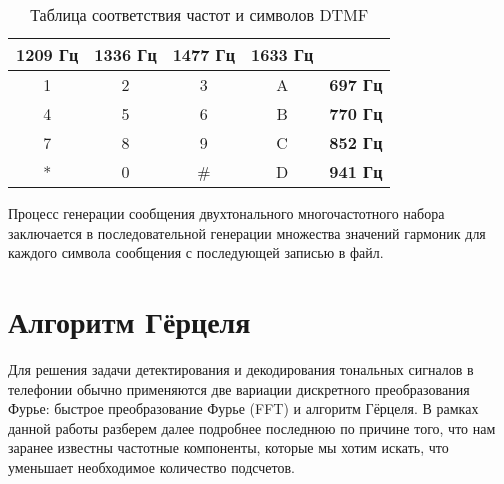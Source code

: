 \begin{table}[ht]
\centering\small
	\caption{Таблица соответствия частот и символов DTMF}
	\label{tab:lrt}	
\begin{tabular}{|c|c|c|c|l|}
\hline
\multicolumn{1}{|l|}{\textbf{1209 Гц}} & \multicolumn{1}{l|}{\textbf{1336 Гц}} & \multicolumn{1}{l|}{\textbf{1477 Гц}} & \multicolumn{1}{l|}{\textbf{1633 Гц}} &                 \\ \hline
1                                      & 2                                     & 3                                     & A                                     & \textbf{697 Гц} \\ \hline
4                                      & 5                                     & 6                                     & B                                     & \textbf{770 Гц} \\ \hline
7                                      & 8                                     & 9                                     & C                                     & \textbf{852 Гц} \\ \hline
*                                      & 0                                     & \#                                    & D                                     & \textbf{941 Гц} \\ \hline
\end{tabular}\normalsize%
\end{table}

Процесс генерации сообщения двухтонального многочастотного набора заключается в последовательной генерации множества значений гармоник для каждого символа сообщения с последующей записью в файл.

\section{Алгоритм Гёрцеля}

Для решения задачи детектирования и декодирования тональных сигналов в телефонии обычно применяются две вариации дискретного преобразования Фурье: быстрое преобразование Фурье (FFT) и алгоритм Гёрцеля. В рамках данной работы разберем далее подробнее последнюю по причине того, что нам заранее известны частотные компоненты, которые мы хотим искать, что уменьшает необходимое количество подсчетов. 

